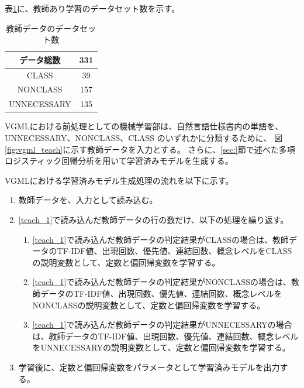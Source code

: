 表\ref{table:data_set}に、教師あり学習のデータセット数を示す。

\begin{table}[t]
    \begin{center}
      \caption{教師データのデータセット数}
      \label{table:data_set}
      \begin{tabular}{c|c}
        データ総数　& 331\\
        \hline
        \hline
        CLASS    & 39\\ \hline
        NONCLASS & 157\\ \hline
        UNNECESSARY   & 135\\ \hline
      \end{tabular}
    \end{center}
  \end{table}

VGMLにおける前処理としての機械学習部は、自然言語仕様書内の単語を、UNNECESSARY、NONCLASS、CLASS のいずれかに分類するために、
図\ref{fig:vgml_teach}に示す教師データを入力とする。
さらに、\ref{sec:}節で述べた多項ロジスティック回帰分析を用いて学習済みモデルを生成する。

VGMLにおける学習済みモデル生成処理の流れを以下に示す。

\begin{enumerate}
	\item 教師データを、入力として読み込む。
    \label{teach_1}
	\item \ref{teach_1}で読み込んだ教師データの行の数だけ、以下の処理を繰り返す。
        \begin{enumerate}
            \item \ref{teach_1}で読み込んだ教師データの判定結果がCLASSの場合は、教師データのTF-IDF値、出現回数、優先値、連結回数、概念レベルをCLASSの説明変数として、定数と偏回帰変数を学習する。
            \item \ref{teach_1}で読み込んだ教師データの判定結果がNONCLASSの場合は、教師データのTF-IDF値、出現回数、優先値、連結回数、概念レベルをNONCLASSの説明変数として、定数と偏回帰変数を学習する。
            \item \ref{teach_1}で読み込んだ教師データの判定結果がUNNECESSARYの場合は、教師データのTF-IDF値、出現回数、優先値、連結回数、概念レベルをUNNECESSARYの説明変数として、定数と偏回帰変数を学習する。
        \end{enumerate}
	\item 学習後に、定数と偏回帰変数をパラメータとして学習済みモデルを出力する。
\end{enumerate}

